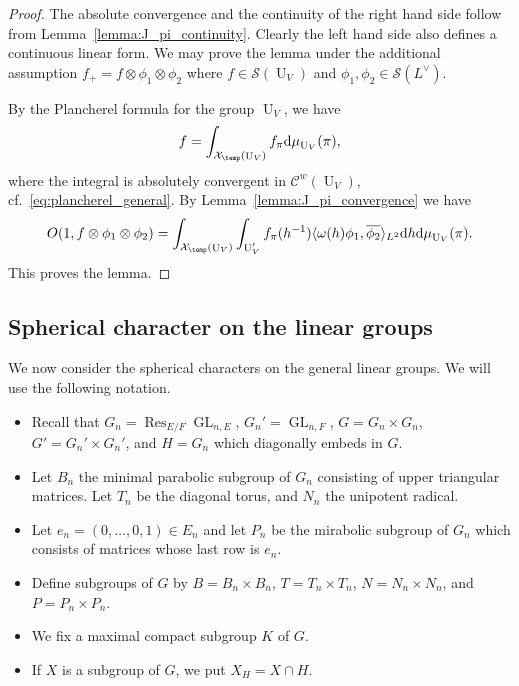 \documentclass[letterpaper,11pt]{amsart}
\newcommand{\cC}{\mathcal{C}}
\newcommand{\cS}{\mathcal{S}}
\newcommand{\cX}{\mathcal{X}}
\newcommand{\rd}{\mathrm{d}}
\newcommand{\<}{\negthickspace}
\DeclareMathOperator{\GL}{GL}
\DeclareMathOperator{\U}{U}
\DeclareMathOperator{\Res}{Res}
\theoremstyle{definition}
\theoremstyle{plain}
\theoremstyle{remark}
\numberwithin{equation}{section}
\begin{document}
\begin{proof}
The absolute convergence and the continuity of the right hand side follow
from Lemma~\ref{lemma:J_pi_continuity}. Clearly the left hand side also
defines a continuous linear form. We may prove the lemma under the additional
assumption $f_+ = f \otimes \phi_1 \otimes \phi_2$ where $f \in \cS(\U_V)$
and $\phi_1, \phi_2 \in \cS(L^\vee)$.

By the Plancherel formula for the group $\U_V$, we have
    \[
    f = \int_{\cX_{\temp}(\U_V)} f_{\pi} \rd \mu_{\U_V}(\pi),
    \]
where the integral is absolutely convergent in $\cC^w(\U_V)$,
cf.~\eqref{eq:plancherel_general}. By Lemma~\ref{lemma:J_pi_convergence} we
have
    \[
    O(1, f \otimes \phi_1 \otimes \phi_2) =
    \int_{\cX_{\temp}(\U_V)} \int_{\U_V'} f_{\pi}(h^{-1})
    \langle \omega(h) \phi_1, \overline{\phi_2} \rangle_{L^2}
    \rd h \rd \mu_{\U_V}(\pi) .
    \]
This proves the lemma.
\end{proof}










\subsection{Spherical character on the linear groups}
\label{subsec:I_pi}
We now consider the spherical characters on the general linear groups.
We will use the following notation.

\begin{itemize}
    \item Recall that $G_n = \Res_{E/F} \GL_{n, E}$, $G_n' = \GL_{n, F}$, $G = G_n \times G_n$,
        $G' = G_n' \times G_n'$, and $H = G_n$ which diagonally embeds in $G$.

    \item Let $B_n$ the minimal parabolic subgroup of $G_n$ consisting of
        upper triangular matrices. Let $T_n$ be the diagonal torus, and
        $N_n$ the unipotent radical.

    \item Let $e_n = (0, \hdots, 0, 1) \in E_n$ and let $P_n$ be the
        mirabolic subgroup of $G_n$ which consists of matrices whose last
        row is $e_n$.

    \item Define subgroups of $G$ by $B = B_n \times B_n$, $T = T_n \times
        T_n$, $N = N_n \times N_n$, and $P = P_n \times P_n$.

    \item We fix a maximal compact subgroup $K$ of $G$.

    \item If $X$ is a subgroup of $G$, we put $X_H = X \cap H$.
\end{itemize}
\end{document}
